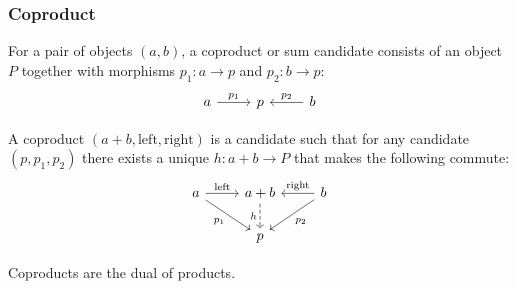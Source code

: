 \subsubsection*{Coproduct}

\begin{definition}

	For a pair of objects $(a, b)$, a coproduct or sum candidate consists of an
	object $P$ together with morphisms $p_1: a\to p$ and
	$p_2:b\to p$:
	\[\begin{tikzcd}[ampersand replacement=\&]
		a \& p \& b
		\arrow["{p_1}", from=1-1, to=1-2]
		\arrow["{p_2}"', from=1-3, to=1-2]
	\end{tikzcd}\]

	A coproduct $(a + b, \mathrm{left}, \mathrm{right})$ is a candidate such that
	for any candidate $(p, p_1, p_2)$ there exists a unique $h: a+b\to P$ that
	makes the following commute:
	\parencite{leinster:basic_category_theory}
	\[\begin{tikzcd}[ampersand replacement=\&]
		a \& {a+b} \& b \\
		\& p
		\arrow["{\mathrm{left}}", from=1-1, to=1-2]
		\arrow["{\mathrm{right}}"', from=1-3, to=1-2]
		\arrow["{p_1}"', from=1-1, to=2-2]
		\arrow["{p_2}", from=1-3, to=2-2]
		\arrow["h"', dashed, from=1-2, to=2-2]
	\end{tikzcd}\]
\end{definition}

\begin{remark}
	Coproducts are the dual of products.
\end{remark}


